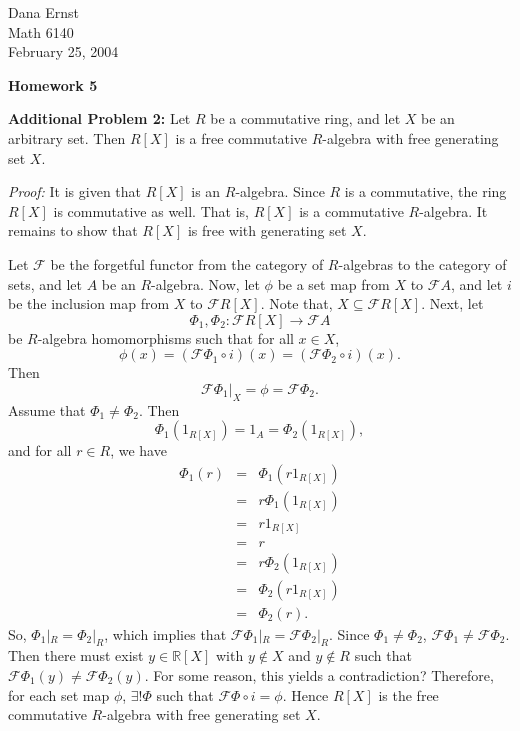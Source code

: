 \documentclass{article}
\newcommand{\R}{\mathbb{R}}
\begin{document}
\begin{flushright}

Dana Ernst \\
Math 6140\\
February 25, 2004\\

\end{flushright}

\medskip

\begin{center}

\textbf{Homework 5}

\end{center}

\begin{flushleft}
\textbf{Additional Problem 2:} Let $R$ be a commutative ring, and let $X$  be an arbitrary set.  Then $R[X]$ is a free commutative $R$-algebra with free generating set $X$.

\medskip

\textit{Proof:} It is given that $R[X]$ is an $R$-algebra.  Since $R$ is a commutative, the ring $R[X]$ is commutative as well.  That is, $R[X]$ is a commutative $R$-algebra.  It remains to show that $R[X]$ is free with generating set $X$.

\medskip

Let $\mathcal{F}$ be the forgetful functor from the category of $R$-algebras to the category of sets, and let $A$ be an $R$-algebra.  Now, let $\phi$ be a set map from $X$ to $\mathcal{F}A$, and let $i$ be the inclusion map from $X$ to $\mathcal{F}R[X]$.  Note that, $X\subseteq \mathcal{F}R[X]$.  Next, let 
$$\Phi_1,\Phi_2:\mathcal{F}R[X]\rightarrow\mathcal{F}A$$
be $R$-algebra homomorphisms such that for all $x \in X$,
$$\phi(x)=(\mathcal{F}\Phi_1\circ i)(x)=(\mathcal{F}\Phi_2\circ i)(x).$$
Then 
$$\mathcal{F}\Phi_1|_X=\phi=\mathcal{F}\Phi_2.$$
Assume that $\Phi_1\neq \Phi_2$.  Then
$$\Phi_1(1_{R[X]})=1_A=\Phi_2(1_{R[X]}),$$
and for all $r \in R$, we have
 \begin{eqnarray*}
 \Phi_1(r)&=&\Phi_1(r1_{R[X]})\\
 &=&r\Phi_1(1_{R[X]})\\
 &=&r1_{R[X]}\\
 &=&r\\
 &=&r\Phi_2(1_{R[X]})\\
 &=&\Phi_2(r1_{R[X]})\\
 &=&\Phi_2(r).
 \end{eqnarray*}
So, $\Phi_1|_R=\Phi_2|_R$, which implies that $\mathcal{F}\Phi_1|_R=\mathcal{F}\Phi_2|_R$.  Since $\Phi_1\neq \Phi_2$, $\mathcal{F}\Phi_1\neq \mathcal{F}\Phi_2$.  Then there must exist $y \in \R[X]$ with $y \notin X$ and $y \notin R$ such that $\mathcal{F}\Phi_1(y)\neq \mathcal{F}\Phi_2(y)$.  For some reason, this yields a contradiction?  Therefore, for each set map $\phi$, $\exists! \Phi$ such that $\mathcal{F}\Phi\circ i=\phi$.  Hence $R[X]$ is the free commutative $R$-algebra with free generating set $X$.


\end{flushleft}
\end{document}
